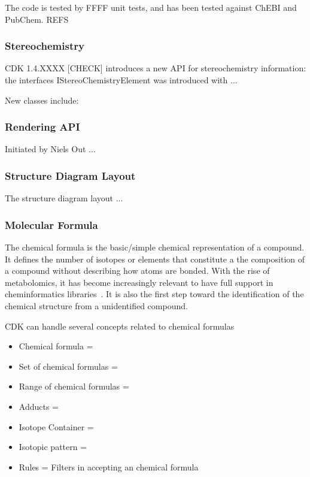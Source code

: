 \documentclass[10pt]{bmc_article}
\newenvironment{bmcformat}{\begin{raggedright}\baselineskip20pt\sloppy\setboolean{publ}{false}}{\end{raggedright}\baselineskip20pt\sloppy}
\begin{document}
\begin{bmcformat}
  The code is tested by FFFF unit tests, and has been tested against ChEBI and PubChem. REFS

  \subsubsection*{Stereochemistry}

  CDK 1.4.XXXX [CHECK] introduces a new API for stereochemistry information: the interfaces
  IStereoChemistryElement was introduced with ...

  New classes include:
  
  
  
  \subsubsection*{Rendering API}

  Initiated by Niels Out ...

  \subsubsection*{Structure Diagram Layout}

  The structure diagram layout ... %

  \subsubsection*{Molecular Formula}

The chemical formula is the basic/simple chemical representation of a compound.
It defines the number of isotopes or elements that constitute a the composition
of a compound without describing how atoms are bonded. With the rise of metabolomics,
it has become increasingly relevant to have full support in cheminformatics
libraries~\cite{RojasChertoXXX}.
It is also the first step
toward the identification of the chemical structure from a unidentified compound.

CDK can handle several concepts related to chemical formulas
\begin{itemize}
\item Chemical formula =
\item Set of chemical formulas =
\item Range of chemical formulas =
\item Adducts =
\item Isotope Container =
\item Isotopic pattern = 
\item Rules = Filters in accepting an chemical formula
\end{itemize}


\end{bmcformat}
\end{document}
